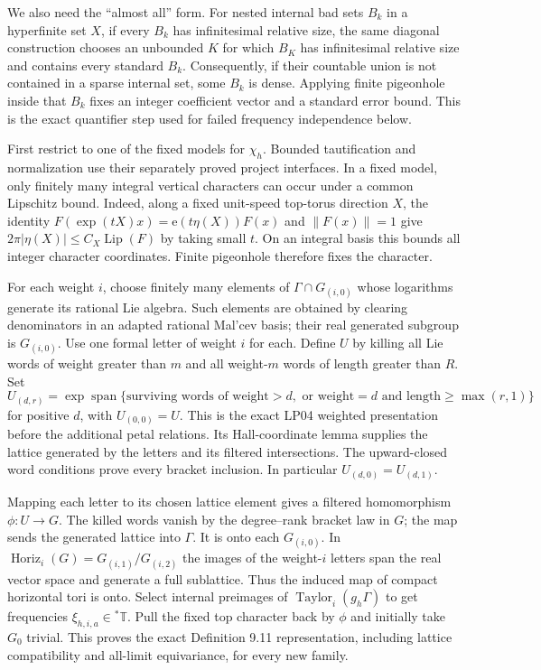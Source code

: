 \documentclass[11pt]{article}
\newcommand{\T}{\mathbb T}\newcommand{\N}{\mathbb N}
\newcommand{\ee}{\mathrm e}\newcommand{\DR}{\mathrm{DR}}
\newcommand{\Hor}{\operatorname{Horiz}}\newcommand{\Tay}{\operatorname{Taylor}}
\begin{document}
We also need the ``almost all'' form. For nested internal bad sets $B_k$
in a hyperfinite set $X$, if every $B_k$ has infinitesimal relative size,
the same diagonal construction chooses an unbounded $K$ for which $B_K$
has infinitesimal relative size and contains every standard $B_k$.
Consequently, if their countable union is not contained in a sparse internal
set, some $B_k$ is dense. Applying finite pigeonhole inside that $B_k$ fixes
an integer coefficient vector and a standard error bound. This is the exact
quantifier step used for failed frequency independence below.

First restrict to one of the fixed models for $\chi_h$. Bounded
tautification and normalization use their separately proved project
interfaces. In a fixed model, only finitely many integral vertical characters
can occur under a common Lipschitz bound. Indeed, along a fixed unit-speed
top-torus direction $X$, the identity
$F(\exp(tX)x)=\ee(t\eta(X))F(x)$ and $\|F(x)\|=1$ give
$2\pi|\eta(X)|\leq C_X\operatorname{Lip}(F)$ by taking small $t$.
On an integral basis this bounds all integer character coordinates. Finite
pigeonhole therefore fixes the character.

For each weight $i$, choose finitely many elements of $\Gamma\cap G_{(i,0)}$
whose logarithms generate its rational Lie algebra. Such elements are obtained
by clearing denominators in an adapted rational Mal'cev basis; their real
generated subgroup is $G_{(i,0)}$. Use one formal letter of weight $i$ for
each. Define $U$ by killing all Lie words of weight greater than $m$ and all
weight-$m$ words of length greater than $R$. Set
\[
 U_{(d,r)}=\exp\operatorname{span}\{\text{surviving words of weight}>d,
 \text{ or weight}=d\text{ and length}\geq\max(r,1)\}
\]
for positive $d$, with $U_{(0,0)}=U$. This is the exact LP04 weighted
presentation before the additional petal relations. Its Hall-coordinate
lemma supplies the lattice generated by the letters and its filtered
intersections. The upward-closed word conditions prove every bracket
inclusion. In particular $U_{(d,0)}=U_{(d,1)}$.

Mapping each letter to its chosen lattice element gives a filtered
homomorphism $\phi:U\to G$. The killed words vanish by the degree--rank
bracket law in $G$; the map sends the generated lattice into $\Gamma$.
It is onto each $G_{(i,0)}$. In
$\Hor_i(G)=G_{(i,1)}/G_{(i,2)}$ the images of the weight-$i$ letters span
the real vector space and generate a full sublattice. Thus the induced
map of compact horizontal tori is onto. Select internal preimages of
$\Tay_i(g_h\Gamma)$ to get frequencies $\xi_{h,i,a}\in{}^*\T$.
Pull the fixed top character back by $\phi$ and initially take $G_0$ trivial.
This proves the exact Definition 9.11 representation, including lattice
compatibility and all-limit equivariance, for every new family.
\end{document}
